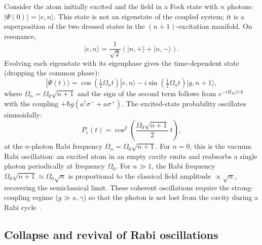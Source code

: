 \documentclass{iopjournal}
\begin{document}
Consider the atom initially excited and the field in a Fock state with $n$ photons: $|\Psi(0)\rangle = |e, n\rangle$. This state is not an eigenstate of the coupled system; it is a superposition of the two dressed states in the $(n{+}1)$-excitation manifold. On resonance,
\begin{equation}
|e, n\rangle = \frac{1}{\sqrt{2}}\left(|n,+\rangle + |n,-\rangle\right).
\end{equation}
Evolving each eigenstate with its eigenphase gives the time-dependent state (dropping the common phase):
\begin{equation}
|\Psi(t)\rangle = \cos\!\left(\tfrac{1}{2}\Omega_n t\right)|e,n\rangle - i\sin\!\left(\tfrac{1}{2}\Omega_n t\right)|g,n{+}1\rangle,
\label{eq:rabi_evolution}
\end{equation}
where $\Omega_n = \Omega_0\sqrt{n+1}$ and the sign of the second term follows from $e^{-iH_{\text{JC}}t/\hbar}$ with the coupling $+\hbar g(a^\dagger\sigma^- + a\sigma^+)$. The excited-state probability oscillates sinusoidally:
\begin{equation}
P_e(t) = \cos^2\!\left(\frac{\Omega_0\sqrt{n+1}}{2}\,t\right),
\label{eq:pe_fock}
\end{equation}
at the $n$-photon Rabi frequency $\Omega_n = \Omega_0\sqrt{n+1}$. For $n = 0$, this is the vacuum Rabi oscillation: an excited atom in an empty cavity emits and reabsorbs a single photon periodically at frequency $\Omega_0$. For $n \gg 1$, the Rabi frequency $\Omega_0\sqrt{n+1} \approx \Omega_0\sqrt{n}$ is proportional to the classical field amplitude $\propto \sqrt{n}$, recovering the semiclassical limit. These coherent oscillations require the strong-coupling regime ($g \gg \kappa, \gamma$) so that the photon is not lost from the cavity during a Rabi cycle~\cite{haroche2006}.


\subsection{Collapse and revival of Rabi oscillations}
\label{sec:collapse_revival}
\end{document}
